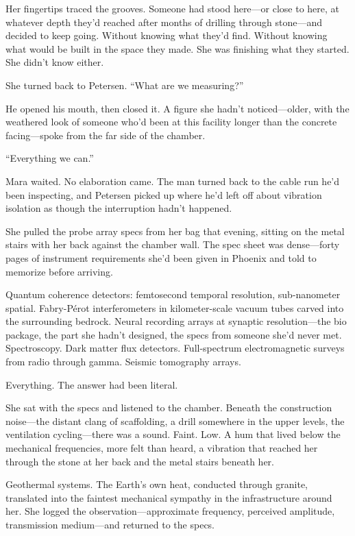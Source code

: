 \documentclass[12pt]{article}
\begin{document}
Her fingertips traced the grooves. Someone had stood here---or close to here, at whatever depth they'd reached after months of drilling through stone---and decided to keep going. Without knowing what they'd find. Without knowing what would be built in the space they made. She was finishing what they started. She didn't know either.

She turned back to Petersen. ``What are we measuring?''

He opened his mouth, then closed it. A figure she hadn't noticed---older, with the weathered look of someone who'd been at this facility longer than the concrete facing---spoke from the far side of the chamber.

``Everything we can.''

Mara waited. No elaboration came. The man turned back to the cable run he'd been inspecting, and Petersen picked up where he'd left off about vibration isolation as though the interruption hadn't happened.

She pulled the probe array specs from her bag that evening, sitting on the metal stairs with her back against the chamber wall. The spec sheet was dense---forty pages of instrument requirements she'd been given in Phoenix and told to memorize before arriving.

Quantum coherence detectors: femtosecond temporal resolution, sub-nanometer spatial. Fabry-P\'{e}rot interferometers in kilometer-scale vacuum tubes carved into the surrounding bedrock. Neural recording arrays at synaptic resolution---the bio package, the part she hadn't designed, the specs from someone she'd never met. Spectroscopy. Dark matter flux detectors. Full-spectrum electromagnetic surveys from radio through gamma. Seismic tomography arrays.

Everything. The answer had been literal.

She sat with the specs and listened to the chamber. Beneath the construction noise---the distant clang of scaffolding, a drill somewhere in the upper levels, the ventilation cycling---there was a sound. Faint. Low. A hum that lived below the mechanical frequencies, more felt than heard, a vibration that reached her through the stone at her back and the metal stairs beneath her.

Geothermal systems. The Earth's own heat, conducted through granite, translated into the faintest mechanical sympathy in the infrastructure around her. She logged the observation---approximate frequency, perceived amplitude, transmission medium---and returned to the specs.
\end{document}
